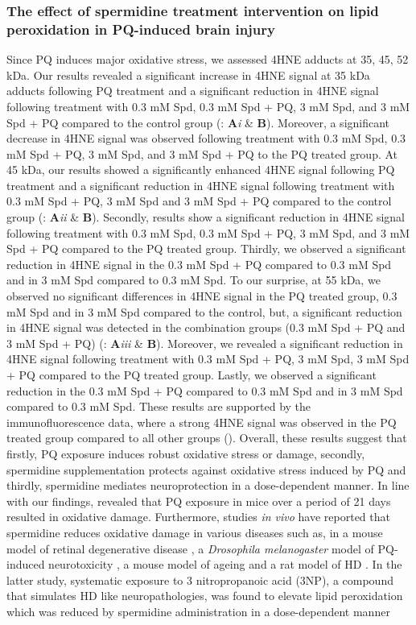 \subsubsection{The effect of spermidine treatment intervention on lipid peroxidation in PQ-induced brain injury}
Since PQ induces major oxidative stress, we assessed 4HNE adducts at 35, 45, 52 kDa. Our results revealed a significant increase in 4HNE signal at 35 kDa adducts following PQ treatment and a significant reduction in 4HNE signal following treatment with 0.3 mM Spd, 0.3 mM Spd + PQ, 3 mM Spd, and 3 mM Spd + PQ compared to the control group (: \textbf{A}\textit{i} \& \textbf{B}). Moreover, a significant decrease in 4HNE signal was observed following treatment with 0.3 mM Spd, 0.3 mM Spd + PQ, 3 mM Spd, and 3 mM Spd + PQ to the PQ treated group. At 45 kDa, our results showed a significantly enhanced 4HNE signal following PQ treatment and a significant reduction in 4HNE signal following treatment with 0.3 mM Spd + PQ, 3 mM Spd and 3 mM Spd + PQ compared to the control group (: \textbf{A}\textit{ii} \& \textbf{B}). Secondly, results show a significant reduction in 4HNE signal following treatment with 0.3 mM Spd, 0.3 mM Spd + PQ, 3 mM Spd, and 3 mM Spd + PQ compared to the PQ treated group. Thirdly, we observed a significant reduction in 4HNE signal in the 0.3 mM Spd + PQ compared to 0.3 mM Spd and in 3 mM Spd compared to 0.3 mM Spd. To our surprise, at 55 kDa, we observed no significant differences in 4HNE signal in the PQ treated group, 0.3 mM Spd and in 3 mM Spd compared to the control, but, a significant reduction in 4HNE signal was detected in the combination groups (0.3 mM Spd + PQ and 3 mM Spd + PQ) (: \textbf{A}\textit{iii} \& \textbf{B}). Moreover, we revealed a significant reduction in 4HNE signal following treatment with 0.3 mM Spd + PQ, 3 mM Spd, 3 mM Spd + PQ compared to the PQ treated group. Lastly, we observed a significant reduction in the 0.3 mM Spd + PQ compared to 0.3 mM Spd and in 3 mM Spd compared to 0.3 mM Spd. These results are supported by the immunofluorescence data, where a strong 4HNE signal was observed in the PQ treated group compared to all other groups (). Overall, these results suggest that firstly, PQ exposure induces robust oxidative stress or damage, secondly, spermidine supplementation protects against oxidative stress induced by PQ and thirdly, spermidine mediates neuroprotection in a dose-dependent manner. In line with our findings, \citet{Chen2012} revealed that PQ exposure in mice over a period of 21 days resulted in oxidative damage. Furthermore, studies \textit{in vivo} have reported that spermidine reduces oxidative damage in various diseases such as, in a mouse model of retinal degenerative disease \citep{Noro2015}, a \textit{Drosophila melanogaster} model of PQ-induced neurotoxicity \citep{Minois2012}, a mouse model of ageing \citep{Eisenberg2009} and a rat model of HD \citep{Jamwal2016}. In the latter study, systematic exposure to 3 nitropropanoic acid (3NP), a compound that simulates HD like neuropathologies, was found to elevate lipid peroxidation which was reduced by spermidine administration in a dose-dependent manner 